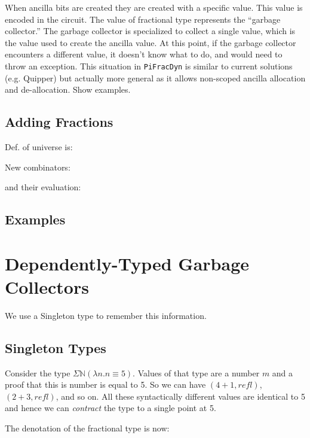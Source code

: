 \documentclass[sigplan,10pt,review,anonymous]{acmart}
\begin{document}
When ancilla bits are created they are created with a specific
value. This value is encoded in the circuit. The value of fractional
type represents the ``garbage collector.''  The garbage collector is
specialized to collect a single value, which is the value used to
create the ancilla value. At this point, if the garbage collector
encounters a different value, it doesn't know what to do, and would
need to throw an exception. This situation in \verb|PiFracDyn| is
similar to current solutions (e.g. Quipper) but actually more general
as it allows non-scoped ancilla allocation and de-allocation. Show
examples.

\subsection{Adding Fractions}

Def. of universe is:

\Udef{}

New combinators:

\EtaEpsilon{}

and their evaluation:

\EtaEpsilonEval{}

\subsection{Examples}

\EtaEpsilonExamples{}

\section{Dependently-Typed Garbage Collectors}

We use a Singleton type
to remember this information. 

\subsection{Singleton Types}

Consider the type $\Sigma \mathbb{N} (\lambda n. n \equiv 5)$. Values
of that type are a number $m$ and a proof that this is number is equal
to 5. So we can have $(4 + 1, \textit{refl})$, $(2 + 3 ,
\textit{refl})$, and so on. All these syntactically different values
are identical to 5 and hence we can \emph{contract} the type to a
single point at 5. 

The denotation of the fractional type is now:
\end{document}

